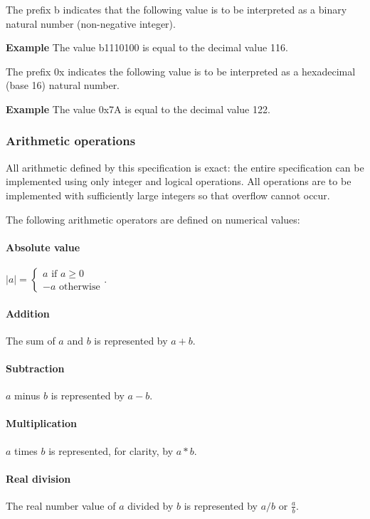 The prefix b indicates that the following value is to be interpreted as a binary
natural number (non-negative integer). 

{\bf Example} The value b1110100 is equal to the decimal value 116. 

The prefix 0x indicates the following value is to be interpreted as a hexadecimal (base 16)
natural number. 

{\bf Example} The value 0x7A is equal to the decimal value 122. 

\subsubsection{Arithmetic operations}
\label{arithoperations}

All arithmetic defined by this specification is exact: the entire 
specification can be implemented using only integer and logical operations.
All operations are to be implemented with sufficiently large integers so 
that overflow cannot occur.

The following arithmetic operators are defined on numerical values:

\paragraph*{Absolute value} $|a|=\left\lbrace\begin{array}{l} a \text{ if $a\geq 0$}\\ 
                                                                                   -a \text{ otherwise} \end{array}\right.$.

\paragraph*{Addition} The sum of $a$ and $b$ is represented by $a+b$.

\paragraph*{Subtraction} $a$ minus $b$ is represented by $a-b$.

\paragraph*{Multiplication} $a$ times $b$ is represented, for clarity, by $a*b$.

\paragraph*{Real division} The real number value of $a$ divided by $b$ is represented by $a/b$ or $\frac{a}{b}$.

